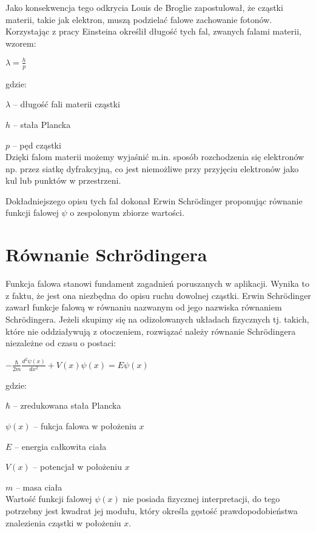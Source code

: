 \documentclass{SGGW-thesis}
\begin{document}
	 Jako konsekwencja tego odkrycia Louis de Broglie zapostulował, że cząstki materii, takie jak elektron, muszą podzielać falowe zachowanie fotonów. Korzystając z pracy Einsteina określił długość tych fal, zwanych falami materii, wzorem:
	 
	 \begin{center}
	 $\lambda=\frac{h}{p}$
	 \end{center}
	 
	 gdzie:
	 
	 $\lambda$ -- długość fali materii cząstki
	 
	 $h$ -- stała Plancka
	 
	 $p$ -- pęd cząstki\\
	 
	 Dzięki falom materii możemy wyjaśnić m.in. sposób rozchodzenia się elektronów np. przez siatkę dyfrakcyjną, co jest niemożliwe przy przyjęciu elektronów jako kul lub punktów w przestrzeni.
	 
	 Dokładniejszego opisu tych fal dokonał Erwin Schrödinger proponując równanie funkcji falowej $\psi$ o zespolonym zbiorze wartości. 
	 
	\section{Równanie Schrödingera}
	Funkcja falowa stanowi fundament zagadnień poruszanych w aplikacji. Wynika to z faktu, że jest ona niezbędna do opisu ruchu dowolnej cząstki. Erwin Schrödinger zawarł funkcje falową w równaniu nazwanym od jego nazwiska równaniem Schrödingera.  Jeżeli skupimy się na odizolowanych układach fizycznych tj. takich, które nie oddziaływują z otoczeniem, rozwiązać należy równanie Schrödingera niezależne od czasu o postaci:
	\begin{center}
	{\large $-\frac{\hbar}{2m} \frac{d^2\psi(x)}{dx^2} + V(x)\psi(x) = E\psi(x)$}
	\end{center}
	gdzie:
	
	$\hbar$ -- zredukowana stała Plancka
	
	$\psi(x)$ -- fukcja falowa w położeniu $x$
	
	$E$ -- energia całkowita ciała
	
	$V(x)$ -- potencjał w położeniu $x$
	
	$m$ -- masa ciała\\
	
	Wartość funkcji falowej $\psi(x)$ nie posiada fizycznej interpretacji, do tego potrzebny jest kwadrat jej modułu, który określa gęstość prawdopodobieństwa znalezienia cząstki w położeniu $x$. 
\end{document}
